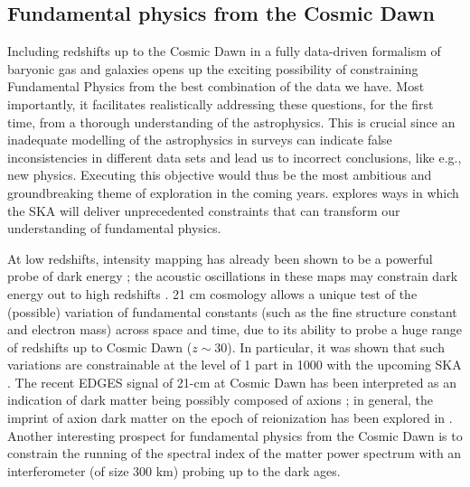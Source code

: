 \subsection{Fundamental physics from the Cosmic Dawn}\label{s:applications}

Including redshifts up to the Cosmic Dawn in a fully data-driven formalism of baryonic gas and galaxies opens up the exciting possibility of constraining Fundamental Physics from the best combination of the data we have. Most importantly, it facilitates realistically addressing these questions, for the first time, from a thorough understanding of the astrophysics. This is crucial since an inadequate modelling of the astrophysics in surveys can indicate false inconsistencies in different data sets and lead us to incorrect conclusions, like e.g., new physics. Executing this objective would thus be the most ambitious and groundbreaking theme of exploration in the coming years.  \cite{weltman2020} explores ways in which the SKA will deliver unprecedented constraints that can transform our understanding of fundamental physics.  

At low redshifts, intensity mapping has already been shown to be a powerful probe of dark energy \cite{chang10}; the acoustic oscillations in these maps may constrain dark energy out to high redshifts \cite{wyithe2008a}. 21 cm cosmology allows a unique test of the (possible) variation of fundamental constants (such as the fine structure constant and electron mass) across space and time, due to its ability to probe a huge range of redshifts up to Cosmic Dawn ($z \sim 30$). In particular, it was shown that such variations are constrainable at the level of 1 part in 1000 with the upcoming SKA \cite{lopez2020}. The recent EDGES signal of 21-cm at Cosmic Dawn has been interpreted as an indication of dark matter being possibly composed of axions \cite{sikivie2019}; in general, the imprint of axion dark matter on the epoch of reionization has been explored in \cite{carucci2019}. Another interesting prospect for fundamental physics from the Cosmic Dawn is to constrain the running of the spectral index of the matter power spectrum with an interferometer (of size 300 km) probing up to the dark ages\cite{weltman2020}.

